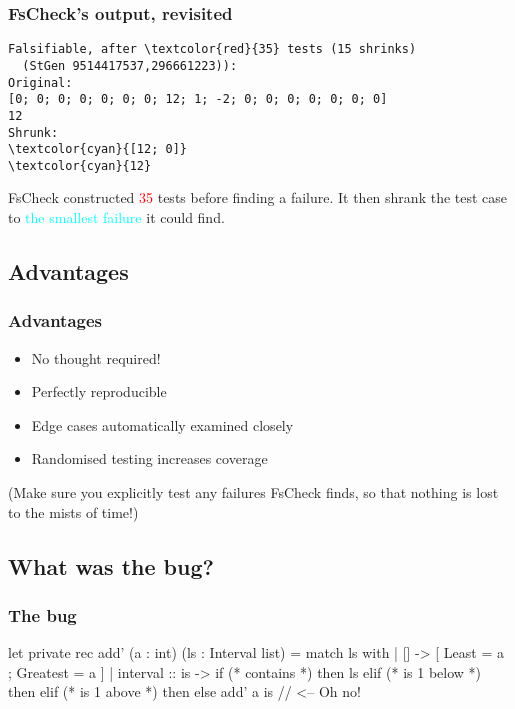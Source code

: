 \documentclass{beamer}
\begin{document}
\begin{frame}[fragile]
\frametitle{FsCheck's output, revisited}
\begin{Verbatim}[commandchars=\\\{\}]
Falsifiable, after \textcolor{red}{35} tests (15 shrinks)
  (StGen 9514417537,296661223)):
Original:
[0; 0; 0; 0; 0; 0; 0; 12; 1; -2; 0; 0; 0; 0; 0; 0; 0]
12
Shrunk:
\textcolor{cyan}{[12; 0]}
\textcolor{cyan}{12}
\end{Verbatim}

\hfill \break

FsCheck constructed \textcolor{red}{35} tests before finding a failure.
It then shrank the test case to \textcolor{cyan}{the smallest failure} it could find.
\end{frame}

\subsection{Advantages}

\begin{frame}
\frametitle{Advantages}

\begin{itemize}
\item No thought required!
\item Perfectly reproducible
\item Edge cases automatically examined closely
\item Randomised testing increases coverage
\end{itemize}

\hfill \break

(Make sure you explicitly test any failures FsCheck finds, so that nothing is lost to the mists of time!)
\end{frame}

\subsection{What was the bug?}
\begin{frame}[fragile]
\frametitle{The bug}
\begin{fslisting}
let private rec add' (a : int) (ls : Interval list) =
    match ls with
    | [] -> [{ Least = a ; Greatest = a }]
    | interval :: is ->
        if (* contains *) then
            ls
        elif (* is 1 below *) then
        elif (* is 1 above *) then
        else
            add' a is // <-- Oh no!
\end{fslisting}
\end{frame}
\end{document}
